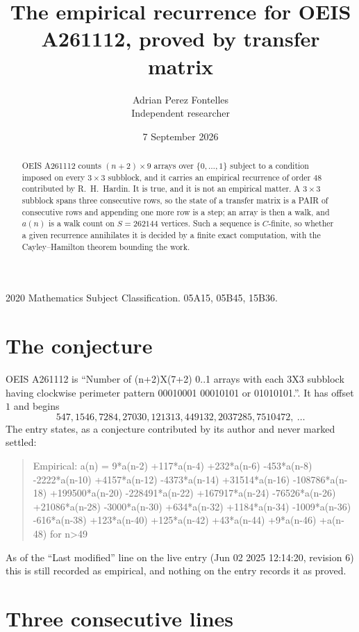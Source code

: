 \documentclass[11pt,a4paper]{article}
\title{The empirical recurrence for OEIS A261112, proved by transfer matrix}
\author{Adrian Perez Fontelles\\ \small Independent researcher}
\date{7 September 2026}
\theoremstyle{plain}
\theoremstyle{definition}
\begin{document}
\maketitle

\begin{abstract}
OEIS A261112 counts $(n+2)\times9$ arrays over $\{0,\dots,1\}$ subject to a condition imposed on
every $3\times3$ subblock, and it carries an empirical recurrence of order $48$
contributed by R.~H.~Hardin. It is true, and it is not an empirical matter. A $3\times3$
subblock spans three consecutive rows, so the state of a transfer matrix is a PAIR of
consecutive rows and appending one more row is a step; an array is then a walk, and
$a(n)$ is a walk count on $S=262144$ vertices. Such a sequence is $C$-finite, so whether a given
recurrence annihilates it is decided by a finite exact computation, with the Cayley--Hamilton
theorem bounding the work.
\end{abstract}

\noindent\small 2020 Mathematics Subject Classification. 05A15, 05B45, 15B36.\normalsize

\section{The conjecture}

OEIS A261112 is ``Number of (n+2)X(7+2) 0..1 arrays with each 3X3 subblock having clockwise perimeter pattern 00010001 00010101 or 01010101.''. It has offset $1$ and begins
\[
547, 1546, 7284, 27030, 121313, 449132, 2037285, 7510472,\ \dots
\]
The entry states, as a conjecture contributed by its author and never marked settled:
\begin{quote}
Empirical: a(n) = 9*a(n-2) +117*a(n-4) +232*a(n-6) -453*a(n-8) -2222*a(n-10) +4157*a(n-12) -4373*a(n-14) +31514*a(n-16) -108786*a(n-18) +199500*a(n-20) -228491*a(n-22) +167917*a(n-24) -76526*a(n-26) +21086*a(n-28) -3000*a(n-30) +634*a(n-32) +1184*a(n-34) -1009*a(n-36) -616*a(n-38) +123*a(n-40) +125*a(n-42) +43*a(n-44) +9*a(n-46) +a(n-48) for n>49
\end{quote}
As of the ``Last modified'' line on the live entry (Jun 02 2025 12:14:20, revision 6) this is still
recorded as empirical, and nothing on the entry records it as proved.

\section{Three consecutive lines}
\end{document}
